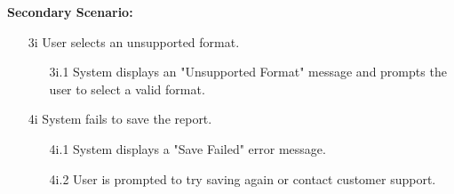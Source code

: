 \documentclass[]{article}
\begin{document}
\begin{enumerate}[{\bf BE1.}]
            \textbf{Secondary Scenario:}
            \begin{enumerate}
                \item[3i] User selects an unsupported format.
                \begin{enumerate}
                    \item[3i.1] System displays an "Unsupported Format" message and prompts the user to select a valid format.
                \end{enumerate}
                \item[4i] System fails to save the report.
                \begin{enumerate}
                    \item[4i.1] System displays a "Save Failed" error message.
                    \item[4i.2] User is prompted to try saving again or contact customer support.
                \end{enumerate}
            \end{enumerate}
    

\end{enumerate}
\end{document}
